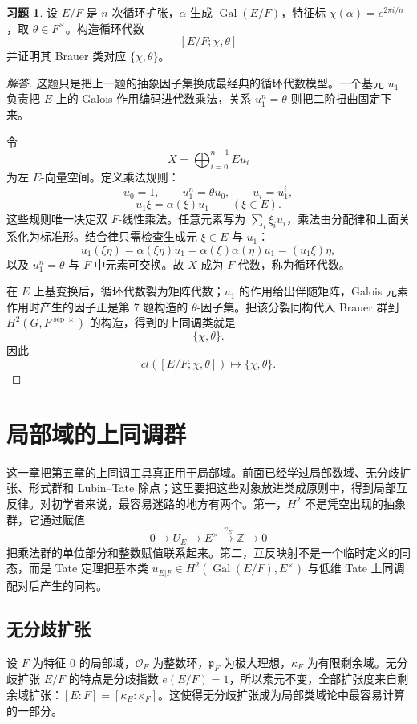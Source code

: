 \documentclass[11pt,a4paper,openany]{ctexbook}
\numberwithin{equation}{chapter}
\newcommand{\Z}{\mathbb{Z}}
\newcommand{\Gal}{\operatorname{Gal}}
\theoremstyle{plain}
\theoremstyle{definition}
\newtheorem{exercise}[theorem]{习题}
\theoremstyle{remark}
\begin{document}
\begin{exercise}
设 $E/F$ 是 $n$ 次循环扩张，$\alpha$ 生成 $\operatorname{Gal}(E/F)$，特征标 $\chi(\alpha)=e^{2\pi i/n}$，取 $\theta\in F^\times$。构造循环代数
\[
 [E/F;\chi,\theta]
\]
并证明其 Brauer 类对应 $\{\chi,\theta\}$。
\end{exercise}

\begin{proof}[解答]
这题只是把上一题的抽象因子集换成最经典的循环代数模型。一个基元 $u_1$ 负责把
$E$ 上的 Galois 作用编码进代数乘法，关系 $u_1^n=\theta$ 则把二阶扭曲固定下来。

令
\[
 X=\bigoplus_{i=0}^{n-1}Eu_i
\]
为左 $E$-向量空间。定义乘法规则：
\[
 u_0=1,\qquad u_1^n=\theta u_0,\qquad u_i=u_1^i,
\]
\[
 u_1\xi=\alpha(\xi)u_1\qquad(\xi\in E).
\]
这些规则唯一决定双 $F$-线性乘法。任意元素写为 $\sum_i\xi_iu_i$，乘法由分配律和上面关系化为标准形。结合律只需检查生成元 $\xi\in E$ 与 $u_1$：
\[
 u_1(\xi\eta)=\alpha(\xi\eta)u_1
 =\alpha(\xi)\alpha(\eta)u_1
 =(u_1\xi)\eta,
\]
以及 $u_1^n=\theta$ 与 $F$ 中元素可交换。故 $X$ 成为 $F$-代数，称为循环代数。

在 $E$ 上基变换后，循环代数裂为矩阵代数；$u_1$ 的作用给出伴随矩阵，Galois 元素作用时产生的因子正是第 7 题构造的 $\theta$-因子集。把该分裂同构代入 Brauer 群到 $H^2(G,F^{\operatorname{sep}\times})$ 的构造，得到的上同调类就是
\[
 \{\chi,\theta\}.
\]
因此
\[
 cl([E/F;\chi,\theta])\longmapsto \{\chi,\theta\}.
\]
\end{proof}
 \chapter{局部域的上同调群}

这一章把第五章的上同调工具真正用于局部域。前面已经学过局部数域、无分歧扩张、形式群和 Lubin--Tate 除点；这里要把这些对象放进类成原则中，得到局部互反律。对初学者来说，最容易迷路的地方有两个。第一，$H^2$ 不是凭空出现的抽象群，它通过赋值
\[
0\longrightarrow U_E\longrightarrow E^\times\stackrel{v_E}{\longrightarrow}\Z\longrightarrow0
\]
把乘法群的单位部分和整数赋值联系起来。第二，互反映射不是一个临时定义的同态，而是 Tate 定理把基本类 $u_{E|F}\in H^2(\Gal(E/F),E^\times)$ 与低维 Tate 上同调配对后产生的同构。

\section{无分歧扩张}

设 $F$ 为特征 $0$ 的局部域，$\mathcal O_F$ 为整数环，$\mathfrak p_F$ 为极大理想，$\kappa_F$ 为有限剩余域。无分歧扩张 $E/F$ 的特点是分歧指数 $e(E/F)=1$，所以素元不变，全部扩张度来自剩余域扩张：$[E:F]=[\kappa_E:\kappa_F]$。这使得无分歧扩张成为局部类域论中最容易计算的一部分。
\end{document}
